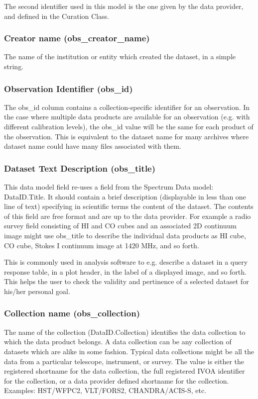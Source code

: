 \documentclass[11pt,a4paper]{ivoa}
\begin{document}
The second identifier used in this model is the one given by the data provider, and defined in the Curation Class.

\subsubsection{Creator name (obs\_creator\_name)}
The name of the institution or entity which created the dataset, in a simple string.

\subsubsection{Observation Identifier (obs\_id)}
The obs\_id column contains a collection-specific identifier for an observation. In the case where multiple data
products are available for an observation (e.g. with different calibration levels), the obs\_id value will be the same
for each product of the observation. This is equivalent to the dataset name for many archives where dataset name could
have many files associated with them.

\subsubsection{Dataset Text Description (obs\_title)}
\label{bkm:Ref292046860}This data model field re-uses a field from the Spectrum Data model: DataID.Title. It should
contain a brief description (displayable in less than one line of text) specifying in scientific terms the content of
the dataset.  The contents of this field are free format and are up to the data provider.  For example a radio survey
field consisting of HI and CO cubes and an associated 2D continuum image might use obs\_title to describe the
individual data products as {\textquotedbl}HI cube{\textquotedbl}, {\textquotedbl}CO cube{\textquotedbl},
{\textquotedbl}Stokes I continuum image at 1420 MHz{\textquotedbl}, and so forth.

This is commonly used in analysis software to e.g. describe a dataset in a query response table, in a plot header, in
the label of a displayed image, and so forth. This helps the user to check the validity and pertinence of a selected
dataset for his/her personal goal.

\subsubsection{Collection name (obs\_collection)}
The name of the collection (DataID.Collection) identifies the data collection to which the data product belongs.  A data
collection can be any collection of datasets which are alike in some fashion.  Typical data collections might be all
the data from a particular telescope, instrument, or survey. The value is either the registered shortname for the data
collection, the full registered IVOA identifier for the collection, or a data provider defined shortname for the
collection. Examples: HST/WFPC2, VLT/FORS2, CHANDRA/ACIS-S, etc.
\end{document}
